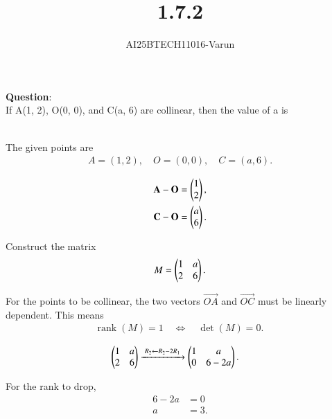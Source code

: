 \documentclass[journal]{IEEEtran}
\begin{document}

\vspace{3cm}

\title{1.7.2}
\author{AI25BTECH11016-Varun}
 \maketitle
{\let\newpage\relax\maketitle}
\renewcommand{\thefigure}{\theenumi}
\renewcommand{\thetable}{\theenumi}
\setlength{\intextsep}{10pt} %

\renewcommand{\thetable}{\theenumi}
\textbf{Question}:\\
If A(1, 2), O(0, 0), and C(a, 6) are collinear, then the value of a is

\solution \\
The given points are
\begin{align}
A = (1,2), \quad O = (0,0), \quad C = (a,6).
\end{align}

\begin{align}    
 \mathbf{A} - \mathbf{O} = \begin{pmatrix}1 \\ 2\end{pmatrix},\\ 
 \mathbf{C} -\mathbf{O} = \begin{pmatrix}a \\ 6\end{pmatrix}.
\end{align}


Construct the matrix
\begin{align} 
M = \begin{pmatrix}1 & a \\ 2 & 6\end{pmatrix}.
\end{align}

For the points to be collinear, the two vectors $\Vec{OA}$ and $\vec{OC}$ must be linearly dependent.  
This means
\begin{align}
\operatorname{rank}(M) = 1 \quad \Leftrightarrow \quad \det(M) = 0. \
\end{align}


\begin{align}
\begin{pmatrix}1 & a \\ 2 & 6\end{pmatrix}
&\xrightarrow{\;R_2 \gets R_2 - 2R_1\;}
\begin{pmatrix}1 & a \\ 0 & 6 - 2a\end{pmatrix}.
\end{align}


For the rank to drop,
\begin{align}
6 - 2a &= 0 \\
a &= 3. 
\end{align}
\end{document}
